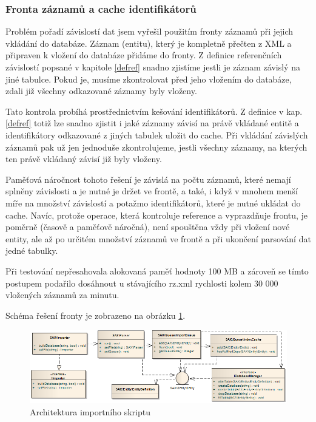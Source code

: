 \documentclass[11pt,twoside,a4paper]{book}
\begin{document}
\subsubsection{Fronta záznamů a cache identifikátorů}
Problém pořadí závislostí dat jsem vyřešil použitím fronty záznamů při jejich vkládání do databáze. Záznam (entitu), který je kompletně přečten z XML a připraven k vložení do databáze přidáme do fronty. Z definice referenčních závislostí popsané v kapitole \ref{defref} snadno zjistíme jestli je záznam závislý na jiné tabulce. Pokud je, musíme zkontrolovat před jeho vložením do databáze, zdali již všechny odkazované záznamy byly vloženy.

Tato kontrola probíhá prostřednictvím kešování identifikátorů. Z definice v kap. \ref{defref} totiž lze snadno zjistit i jaké záznamy závisí na právě vkládané entitě a identifikátory odkazované z jiných tabulek uložit do cache. Při vkládání závislých záznamů pak už jen jednoduše zkontrolujeme, jestli všechny záznamy, na kterých ten právě vkládaný závisí již byly vloženy. 

Paměťová náročnost tohoto řešení je závislá na počtu záznamů, které nemají splněny závislosti a je nutné je držet ve frontě, a také, i když v mnohem menší míře na množství závislostí a potažmo identifikátorů, které je nutné ukládat do cache. Navíc, protože operace, která kontroluje reference a vyprazdňuje frontu, je poměrně  (časově a paměťově náročná), není spouštěna vždy při vložení nové entity, ale až po určitém množství záznamů ve frontě a při ukončení parsování dat jedné tabulky.

Při testování nepřesahovala alokovaná paměť hodnoty 100 MB a zároveň se tímto postupem podařilo dosáhnout u stávajícího rz.xml rychlosti kolem 30 000 vložených záznamů za minutu.

Schéma řešení fronty je zobrazeno na obrázku \ref{fig:queue}.

\begin{figure}[h]
\begin{center}
\includegraphics[scale=0.5]{figures/import.png}
\caption{Architektura importního skriptu}
\label{fig:queue}
\end{center}
\end{figure}
\end{document}
